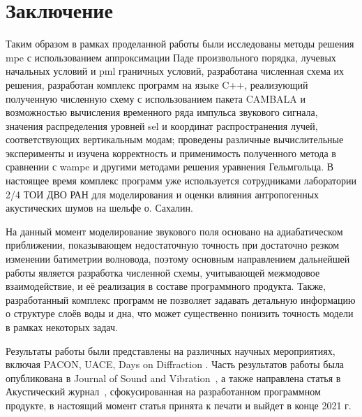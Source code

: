 \documentclass[../document.tex]{subfiles}
\begin{document}
    \section*{Заключение}
    \par Таким образом в рамках проделанной работы были исследованы методы решения \acrshort{mpe} с использованием аппроксимации Паде произвольного порядка, лучевых начальных условий и \acrshort{pml} граничных условий, разработана численная схема их решения, разработан комплекс программ на языке C++, реализующий полученную численную схему с использованием пакета CAMBALA и возможностью вычисления временного ряда импульса звукового сигнала, значения распределения уровней \acrshort{sel} и координат распространения лучей, соответствующих вертикальным модам; проведены различные вычислительные эксперименты и изучена корректность и применимость полученного метода в сравнении с \acrshort{wampe} и другими методами решения уравнения Гельмгольца. В настоящее время комплекс программ уже используется сотрудниками лаборатории 2/4 ТОИ ДВО РАН для моделирования и оценки влияния антропогенных акустических шумов на шельфе о. Сахалин.
    \par На данный момент моделирование звукового поля основано на адиабатическом приближении, показывающем недостаточную точность при достаточно резком изменении батиметрии волновода, поэтому основным направлением дальнейшей работы является разработка численной схемы, учитывающей межмодовое взаимодействие, и её реализация в составе программного продукта. Также, разработанный комплекс программ не позволяет задавать детальную информацию о структуре слоёв воды и дна, что может существенно понизить точность модели в рамках некоторых задач. 
    \par Результаты работы были представлены на различных научных мероприятиях, включая PACON, UACE, Days on Diffraction \cite{dd}. Часть результатов работы была опубликована в \guillemotleft Journal of Sound and Vibration\guillemotright\ \cite{jsv}, а также направлена статья в \guillemotleft Акустический журнал\guillemotright\ \cite{acoustic_journal}, сфокусированная на разработанном программном продукте, в настоящий момент статья принята к печати и выйдет в конце 2021 г.
\end{document}
